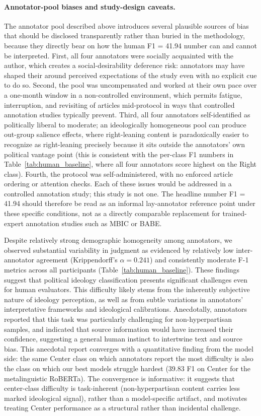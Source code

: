 \paragraph{Annotator-pool biases and study-design caveats.} The annotator pool described above introduces several plausible sources of bias that should be disclosed transparently rather than buried in the methodology, because they directly bear on how the human F1 = 41.94 number can and cannot be interpreted. First, all four annotators were socially acquainted with the author, which creates a social-desirability deference risk: annotators may have shaped their  around perceived expectations of the study even with no explicit cue to do so. Second, the pool was uncompensated and worked at their own pace over a one-month window in a non-controlled environment, which permits fatigue, interruption, and revisiting of articles mid-protocol in ways that controlled annotation studies typically prevent. Third, all four annotators self-identified as politically liberal to moderate; an ideologically homogeneous pool can produce out-group salience effects, where right-leaning content is paradoxically easier to recognize as right-leaning precisely because it sits outside the annotators' own political vantage point (this is consistent with the per-class F1 numbers in Table~\ref{tab:human_baseline}, where all four annotators score highest on the Right class). Fourth, the protocol was self-administered, with no enforced article ordering or attention checks. Each of these issues would be addressed in a controlled annotation study; this study is not one. The headline number F1 = 41.94 should therefore be read as an informal lay-annotator reference point under these specific conditions, not as a directly comparable replacement for trained-expert annotation studies such as MBIC or BABE.

Despite relatively strong demographic homogeneity among annotators, we observed substantial variability in judgment as evidenced by relatively low inter-annotator agreement (Krippendorff's $\alpha = 0.241$) and consistently moderate F-1 metrics across all participants (Table~\ref{tab:human_baseline}). These findings suggest that political ideology classification presents significant challenges even for human evaluators. This difficulty likely stems from the inherently subjective nature of ideology perception, as well as from subtle variations in annotators' interpretative frameworks and ideological calibrations. Anecdotally, annotators reported that this task was particularly challenging for non-hyperpartisan samples, and indicated that source information would have increased their confidence, suggesting a general human instinct to intertwine text and source bias. This anecdotal report converges with a quantitative finding from the model side: the same Center class on which annotators report the most difficulty is also the class on which our best models struggle hardest (39.83 F1 on Center for the metalinguistic RoBERTa). The convergence is informative: it suggests that center-class difficulty is task-inherent (non-hyperpartisan content carries less marked ideological signal), rather than a model-specific artifact, and motivates treating Center performance as a structural rather than incidental challenge.
